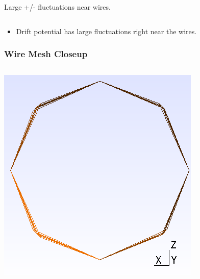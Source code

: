 \documentclass[xcolor=dvipsnames]{beamer}
\begin{document}
\begin{frame}
\begin{columns}
\begin{column}{0.5\textwidth}
\begin{center}
        \scriptsize Large +/- fluctuations near wires.
      \end{center}
    \end{column}
  \end{columns}
  
  \vfill
  \begin{itemize}
  \item Drift potential has large fluctuations right near the wires.
  \end{itemize}
\end{frame}

\begin{frame}
  \frametitle{Wire Mesh Closeup}
  \begin{columns}
    \begin{column}{0.5\textwidth}
      \begin{center}
        \includegraphics[height=0.6\textheight]{wire-cross-section.png}


\end{center}
\end{column}
\end{columns}
\end{frame}
\end{document}
